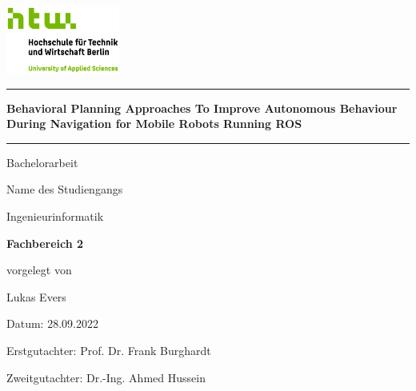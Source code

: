 \begin{titlepage}

\begin{center}
\includegraphics[width=0.28\textwidth,keepaspectratio]{images/HTW_Logo_rgb.jpg}
\end{center}

\bigskip
\bigskip 
\bigskip 
\bigskip 

\par\noindent\rule{\textwidth}{0.4pt}

\bigskip 
\bigskip 
\bigskip 
 
\begin{center}
	\begin{Large}
		\color{htwgreen}
		\textbf{Behavioral Planning Approaches To Improve Autonomous Behaviour During
Navigation for Mobile Robots Running ROS}
	\end{Large}
	
	\bigskip 
	\bigskip 
	\par\noindent\rule{\textwidth}{0.4pt}
	
	\medskip 
	Bachelorarbeit
	\bigskip 
	\bigskip
	\bigskip 
	\bigskip 
	\bigskip 
	\bigskip
	\bigskip 
	\bigskip 

	\bigskip
	Name des Studiengangs\\
	
	\medskip
	\begin{Large}
		Ingenieurinformatik
	\end{Large}
	
	\bigskip 
	\begin{Large}
		\color{htwgreen}
		\textbf{Fachbereich 2}
	\end{Large}

	\bigskip 
	vorgelegt von \\
		
	\begin{Large}
		Lukas Evers\\
		
	\end{Large}
	
	\bigskip 
	\bigskip 
	\bigskip 
	\bigskip 
	\bigskip 
	\bigskip 
	\bigskip 
	\bigskip 
	\bigskip 
	\bigskip 
	\bigskip 
	\bigskip 
	
	\bigskip 
	\bigskip 
	\bigskip 
	
	\bigskip 
	\bigskip
	Datum:
	28.09.2022\\
	\bigskip
	
	\begin{Large}
		Erstgutachter: Prof. Dr. Frank Burghardt \\
		
	\end{Large}
	
	\begin{Large}
		Zweitgutachter: Dr.-Ing. Ahmed Hussein \\
		
	\end{Large}


\end{center}

\end{titlepage}
